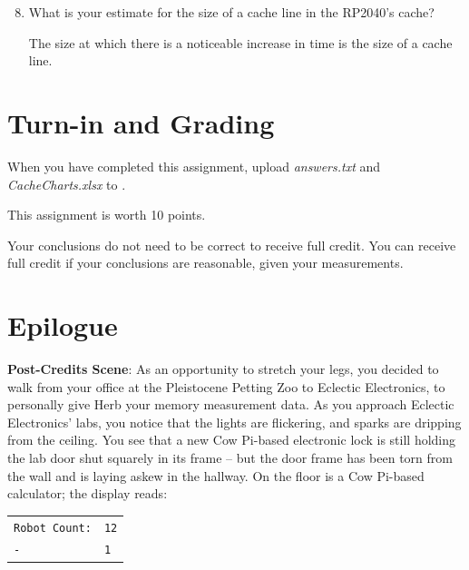 \begin{enumerate}
    \setcounter{enumi}{7}

    \item What is your estimate for the size of a cache line in the RP2040's cache?

    The size at which there is a noticeable increase in time is the size of a cache line.
\end{enumerate}



\section*{Turn-in and Grading}

When you have completed this assignment, upload \textit{answers.txt} and
\textit{CacheCharts.xlsx} to \filesubmission.

This assignment is worth 10 points. \\

\begin{description}
\end{description}

Your conclusions do not need to be correct to receive full credit.
You can receive full credit if your conclusions are reasonable, given your measurements.


\section*{Epilogue}

{\large \textbf{Post-Credits Scene}:} As an opportunity to stretch your legs,
you decided to walk from your office at the Pleistocene Petting Zoo to Eclectic
Electronics, to personally give Herb your memory measurement data. As you
approach Eclectic Electronics' labs, you notice that the lights are flickering,
and sparks are dripping from the ceiling. You see that a new Cow Pi-based
electronic lock is still holding the lab door shut squarely in its frame -- but
the door frame has been torn from the wall and is laying askew in the hallway.
On the floor is a Cow Pi-based calculator; the display reads: \\
\begin{tabular}{>{\raggedleft}p{3.5cm}>{\raggedleft\arraybackslash}p{1cm}}
    \rowcolor{LightGreen}\texttt{Robot Count:\phantom{xxxx}} & \texttt{12} \\
    \rowcolor{LightGreen}\texttt{-} & \texttt{1}
\end{tabular}


